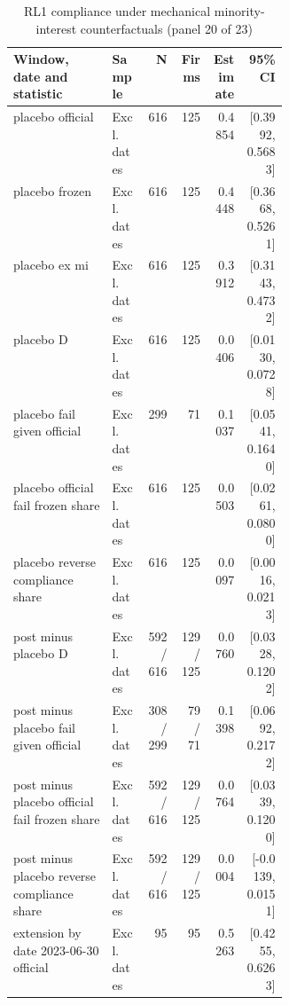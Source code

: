 \begin{table}[!htbp]\centering\scriptsize
\caption{RL1 compliance under mechanical minority-interest counterfactuals (panel 20 of 23)}
\begin{threeparttable}
\begin{tabular}{p{0.36\linewidth}lrrrr}
\toprule
Window, date and statistic & Sample & N & Firms & Estimate & 95\% CI \\
\midrule
placebo  official & Excl. dates & 616 & 125 & 0.4854 & [0.3992, 0.5683] \\
placebo  frozen & Excl. dates & 616 & 125 & 0.4448 & [0.3668, 0.5261] \\
placebo  ex mi & Excl. dates & 616 & 125 & 0.3912 & [0.3143, 0.4732] \\
placebo  D & Excl. dates & 616 & 125 & 0.0406 & [0.0130, 0.0728] \\
placebo  fail given official & Excl. dates & 299 & 71 & 0.1037 & [0.0541, 0.1640] \\
placebo  official fail frozen share & Excl. dates & 616 & 125 & 0.0503 & [0.0261, 0.0800] \\
placebo  reverse compliance share & Excl. dates & 616 & 125 & 0.0097 & [0.0016, 0.0213] \\
post minus placebo  D & Excl. dates & 592 / 616 & 129 / 125 & 0.0760 & [0.0328, 0.1202] \\
post minus placebo  fail given official & Excl. dates & 308 / 299 & 79 / 71 & 0.1398 & [0.0692, 0.2172] \\
post minus placebo  official fail frozen share & Excl. dates & 592 / 616 & 129 / 125 & 0.0764 & [0.0339, 0.1200] \\
post minus placebo  reverse compliance share & Excl. dates & 592 / 616 & 129 / 125 & 0.0004 & [-0.0139, 0.0151] \\
extension by date 2023-06-30 official & Excl. dates & 95 & 95 & 0.5263 & [0.4255, 0.6263] \\
\bottomrule
\end{tabular}
\begin{tablenotes}[flushleft]\footnotesize

\end{tablenotes}
\end{threeparttable}
\end{table}
